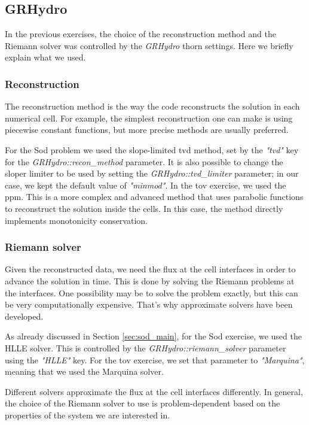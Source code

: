 \documentclass[11pt, a4paper]{article}
\begin{document}
\subsection{GRHydro}

In the previous exercises, the choice of the reconstruction method and the Riemann solver was controlled by the \textit{GRHydro} thorn settings. Here we briefly explain what we used.

\subsubsection{Reconstruction}

The reconstruction method is the way the code reconstructs the solution in each numerical cell. For example, the simplest reconstruction one can make is using piecewise constant functions, but more precise methods are usually preferred.

For the Sod problem we used the slope-limited \acrshort{tvd} method, set by the \textit{"tvd"} key for the \textit{GRHydro::recon\_method} parameter. It is also possible to change the sloper limiter to be used by setting the \textit{GRHydro::tvd\_limiter} parameter; in our case, we kept the default value of \textit{"minmod"}. In the \acrshort{tov} exercise, we used the \acrfull{ppm}. This is a more complex and advanced method that uses parabolic functions to reconstruct the solution inside the cells. In this case, the method directly implements monotonicity conservation.

\subsubsection{Riemann solver}

Given the reconstructed data, we need the flux at the cell interfaces in order to advance the solution in time. This is done by solving the Riemann problems at the interfaces. One possibility may be to solve the problem exactly, but this can be very computationally expensive. That's why approximate solvers have been developed.

As already discussed in Section \ref{sec:sod_main}, for the Sod exercise, we used the HLLE solver. This is controlled by the \textit{GRHydro::riemann\_solver} parameter using the \textit{"HLLE"} key. For the \acrshort{tov} exercise, we set that parameter to \textit{"Marquina"}, meaning that we used the Marquina solver.

Different solvers approximate the flux at the cell interfaces differently. In general, the choice of the Riemann solver to use is problem-dependent based on the properties of the system we are interested in.
\end{document}
